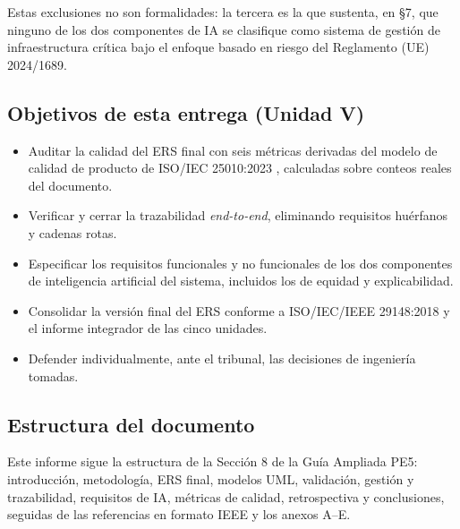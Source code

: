 Estas exclusiones no son formalidades: la tercera es la que sustenta, en \S7, que ninguno de los dos componentes de IA se clasifique como sistema de gesti\'on de infraestructura cr\'itica bajo el enfoque basado en riesgo del Reglamento (UE) 2024/1689.

\subsection{Objetivos de esta entrega (Unidad V)}

\begin{itemize}
\item Auditar la calidad del ERS final con seis m\'etricas derivadas del modelo de calidad de producto de ISO/IEC 25010:2023 \cite{iso25010_2023}, calculadas sobre conteos reales del documento.
\item Verificar y cerrar la trazabilidad \emph{end-to-end}, eliminando requisitos hu\'erfanos y cadenas rotas.
\item Especificar los requisitos funcionales y no funcionales de los dos componentes de inteligencia artificial del sistema, incluidos los de equidad y explicabilidad.
\item Consolidar la versi\'on final del ERS conforme a ISO/IEC/IEEE 29148:2018 \cite{iso29148_2018} y el informe integrador de las cinco unidades.
\item Defender individualmente, ante el tribunal, las decisiones de ingenier\'ia tomadas.
\end{itemize}

\subsection{Estructura del documento}

Este informe sigue la estructura de la Secci\'on 8 de la Gu\'ia Ampliada PE5: introducci\'on, metodolog\'ia, ERS final, modelos UML, validaci\'on, gesti\'on y trazabilidad, requisitos de IA, m\'etricas de calidad, retrospectiva y conclusiones, seguidas de las referencias en formato IEEE y los anexos A--E.
